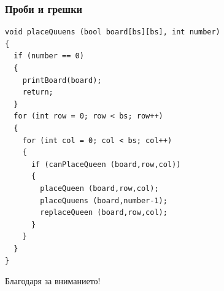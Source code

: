 \documentclass{beamer}
\begin{document}
\begin{frame}[fragile]
\frametitle{Проби и грешки}

\begin{lstlisting}
void placeQuuens (bool board[bs][bs], int number)
{
  if (number == 0)
  {
    printBoard(board);
    return;
  }
  for (int row = 0; row < bs; row++)
  {
    for (int col = 0; col < bs; col++)
    {
      if (canPlaceQueen (board,row,col))
      {
        placeQueen (board,row,col);
        placeQuuens (board,number-1);
        replaceQueen (board,row,col);
      }
    }
  }
}

\end{lstlisting}
\end{frame}

\begin{frame}
\centerline{Благодаря за вниманието!}
\end{frame}
\end{document}
